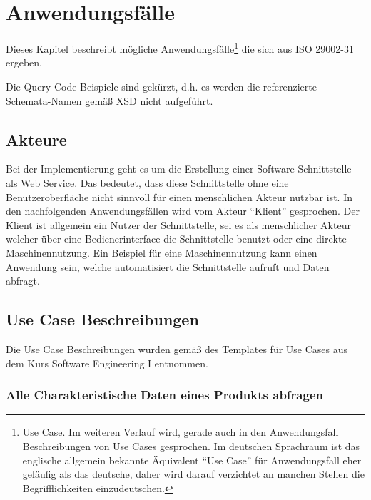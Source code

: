 \section{Anwendungsfälle}\label{kap:Use_Cases}

Dieses Kapitel beschreibt mögliche Anwendungsfälle\footnote{Use Case. Im weiteren Verlauf wird, gerade auch in den Anwendungsfall Beschreibungen von Use Cases gesprochen. Im deutschen Sprachraum ist das englische allgemein bekannte Äquivalent \enquote{Use Case} für Anwendungsfall eher geläufig als das deutsche, daher wird darauf verzichtet an manchen Stellen die Begrifflichkeiten einzudeutschen.} die sich aus ISO 29002-31 ergeben. 


Die Query-Code-Beispiele sind gekürzt, d.h. es werden die referenzierte Schemata-Namen gemäß XSD nicht aufgeführt. 


\subsection{Akteure}
Bei der Implementierung geht es um die Erstellung einer Software-Schnittstelle als Web Service. Das bedeutet, dass diese Schnittstelle ohne eine Benutzeroberfläche nicht sinnvoll für einen menschlichen Akteur nutzbar ist. In den nachfolgenden Anwendungsfällen wird vom Akteur \enquote{Klient} gesprochen. Der Klient ist allgemein ein Nutzer der Schnittstelle, sei es als menschlicher Akteur welcher über eine Bedienerinterface die Schnittstelle benutzt oder eine direkte Maschinennutzung. Ein Beispiel für eine Maschinennutzung kann einen Anwendung sein, welche automatisiert die Schnittstelle aufruft und Daten abfragt.    


\subsection{Use Case Beschreibungen}

Die Use Case Beschreibungen wurden gemäß des Templates für Use Cases aus dem Kurs Software Engineering I entnommen. 

\subsubsection{Alle Charakteristische Daten eines Produkts abfragen}

